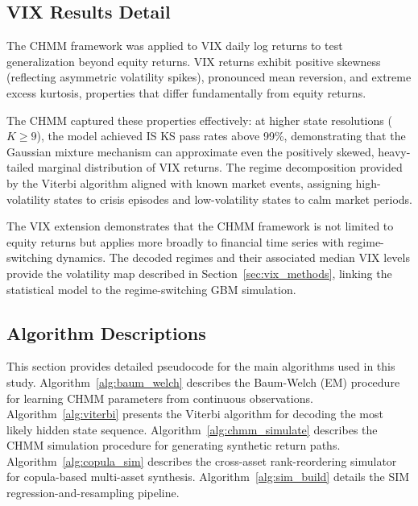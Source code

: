 \subsection{VIX Results Detail}

The CHMM framework was applied to VIX daily log returns to test generalization beyond equity returns.
VIX returns exhibit positive skewness (reflecting asymmetric volatility spikes), pronounced mean reversion, and extreme excess kurtosis, properties that differ fundamentally from equity returns.

The CHMM captured these properties effectively: at higher state resolutions ($K \geq 9$), the model achieved IS KS pass rates above 99\%, demonstrating that the Gaussian mixture mechanism can approximate even the positively skewed, heavy-tailed marginal distribution of VIX returns.
The regime decomposition provided by the Viterbi algorithm aligned with known market events, assigning high-volatility states to crisis episodes and low-volatility states to calm market periods.

The VIX extension demonstrates that the CHMM framework is not limited to equity returns but applies more broadly to financial time series with regime-switching dynamics.
The decoded regimes and their associated median VIX levels provide the volatility map described in Section~\ref{sec:vix_methods}, linking the statistical model to the regime-switching GBM simulation.

\subsection{Algorithm Descriptions}
\label{sec:algorithms}

This section provides detailed pseudocode for the main algorithms used in this study.
Algorithm~\ref{alg:baum_welch} describes the Baum-Welch (EM) procedure for learning CHMM parameters from continuous observations.
Algorithm~\ref{alg:viterbi} presents the Viterbi algorithm for decoding the most likely hidden state sequence.
Algorithm~\ref{alg:chmm_simulate} describes the CHMM simulation procedure for generating synthetic return paths.
Algorithm~\ref{alg:copula_sim} describes the cross-asset rank-reordering simulator for copula-based multi-asset synthesis.
Algorithm~\ref{alg:sim_build} details the SIM regression-and-resampling pipeline.

